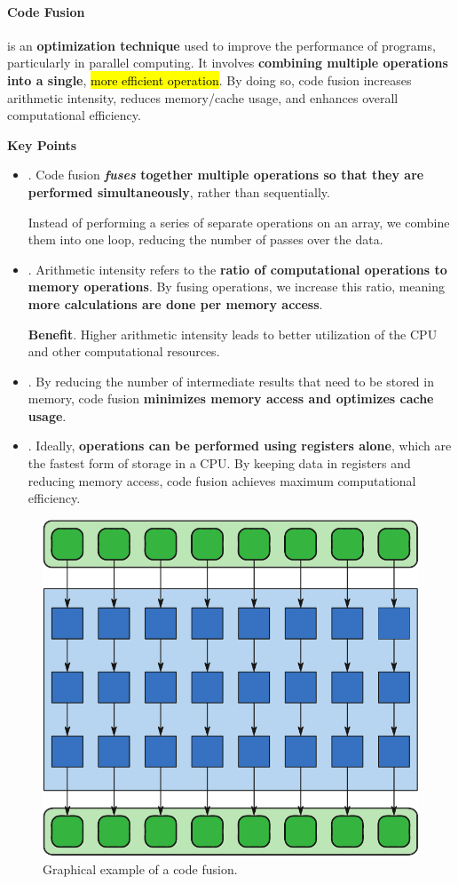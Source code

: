 \paragraph{Code Fusion}

 is an \textbf{optimization technique} used to improve the performance of programs, particularly in parallel computing. It involves \textbf{combining multiple operations into a single}, \hl{more efficient operation}. By doing so, code fusion increases arithmetic intensity, reduces memory/cache usage, and enhances overall computational efficiency.

\highspace
\begin{flushleft}
    \textcolor{Green3}{ \textbf{Key Points}}
\end{flushleft}
\begin{itemize}
    \item {}. Code fusion \textbf{\emph{fuses} together multiple operations so that they are performed simultaneously}, rather than sequentially.
    \begin{examplebox}
        Instead of performing a series of separate operations on an array, we combine them into one loop, reducing the number of passes over the data.
    \end{examplebox}


    \item {}. Arithmetic intensity refers to the \textbf{ratio of computational operations to memory operations}. By fusing operations, we increase this ratio, meaning \textbf{more calculations are done per memory access}.

    \textcolor{Green3}{ \textbf{Benefit}}. Higher arithmetic intensity leads to better utilization of the CPU and other computational resources.


    \item {}. By reducing the number of intermediate results that need to be stored in memory, code fusion \textbf{minimizes memory access and optimizes cache usage}.


    \item {}. Ideally, \textbf{operations can be performed using registers alone}, which are the fastest form of storage in a CPU. By keeping data in registers and reducing memory access, code fusion achieves maximum computational efficiency.
\end{itemize}

\begin{figure}[!htp]
    \centering
    \includegraphics[width=.45\textwidth]{img/code-fusion-1.pdf}
    \caption{Graphical example of a code fusion.}
\end{figure}
